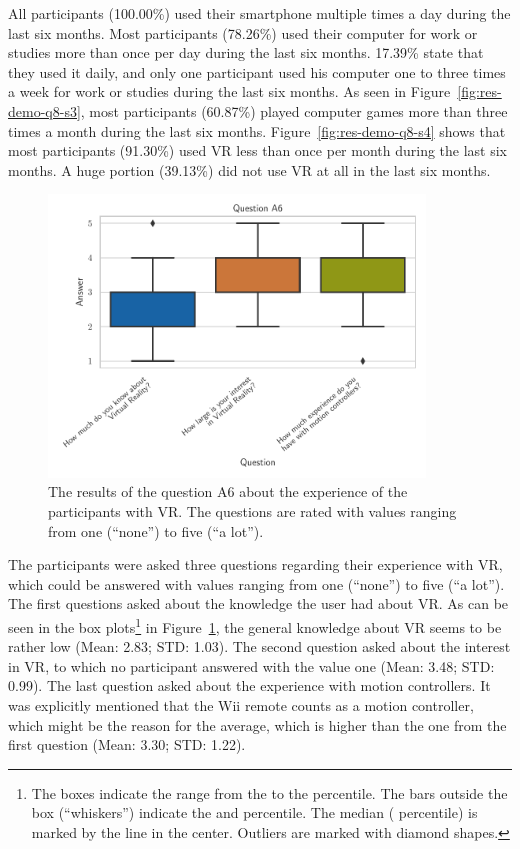 All participants (100.00\%) used their smartphone multiple times a day during the last six months. Most participants (78.26\%) used their computer for work or studies more than once per day during the last six months. 17.39\% state that they used it daily, and only one participant used his computer one to three times a week for work or studies during the last six months. As seen in Figure~\ref{fig:res-demo-q8-s3}, most participants (60.87\%) played computer games more than three times a month during the last six months. Figure~\ref{fig:res-demo-q8-s4} shows that most participants (91.30\%) used \ac{VR} less than once per month during the last six months. A huge portion (39.13\%) did not use \ac{VR} at all in the last six months.

\begin{figure}[H]
  \centering
  \includegraphics[width=10cm]{figures/evaluation/res_demo_q9.pdf}
  \caption[VR experience of the participants]{The results of the question A6 about the experience of the participants with \ac{VR}. The questions are rated with values ranging from one (\enquote{none}) to five (\enquote{a lot}).}\label{fig:res-demo-q9}
\end{figure}

The participants were asked three questions regarding their experience with \ac{VR}, which could be answered with values ranging from one (\enquote{none}) to five (\enquote{a lot}). The first questions asked about the knowledge the user had about \ac{VR}. As can be seen in the box plots\footnote{The boxes indicate the range from the  to the  percentile. The bars outside the box (\enquote{whiskers}) indicate the  and  percentile. The median ( percentile) is marked by the line in the center. Outliers are marked with diamond shapes.} in Figure~\ref{fig:res-demo-q9}, the general knowledge about \ac{VR} seems to be rather low (Mean: 2.83; \ac{STD}: 1.03). The second question asked about the interest in \ac{VR}, to which no participant answered with the value one (Mean: 3.48; \ac{STD}: 0.99). The last question asked about the experience with motion controllers. It was explicitly mentioned that the Wii remote counts as a motion controller, which might be the reason for the average, which is higher than the one from the first question (Mean: 3.30; \ac{STD}: 1.22).



